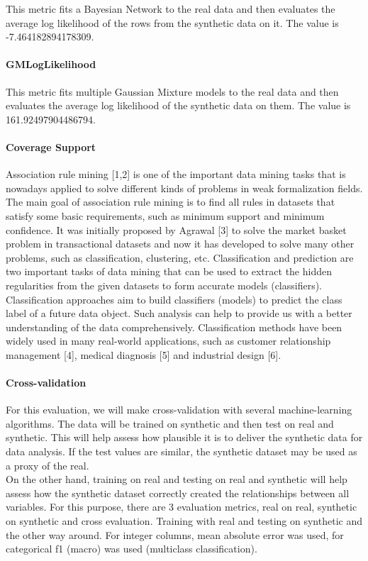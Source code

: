 \documentclass{article}
\begin{document}
This metric fits a Bayesian Network to the real data and then evaluates the average log likelihood of the rows from the synthetic data on it.
The value is -7.464182894178309.\\


\paragraph{GMLogLikelihood}

This metric fits multiple Gaussian Mixture models to the real data and then evaluates the average log likelihood of the synthetic data on them.
The value is 161.92497904486794.\\

\paragraph{Coverage Support}
Association rule mining [1,2] is one of the important data mining tasks that is nowadays applied to solve different kinds of problems in weak formalization fields. The main goal of association rule mining is to find all rules in datasets that satisfy some basic requirements, such as minimum support and minimum confidence. It was initially proposed by Agrawal [3] to solve the market basket problem in transactional datasets and now it has developed to solve many other problems, such as classification, clustering, etc. Classification and prediction are two important tasks of data mining that can be used to extract the hidden regularities from the given datasets to form accurate models (classifiers). Classification approaches aim to build classifiers (models) to predict the class label of a future data object. Such analysis can help to provide us with a better understanding of the data comprehensively. Classification methods have been widely used in many real-world applications, such as customer relationship management [4], medical diagnosis [5] and industrial design [6].

\paragraph{Cross-validation}
For this evaluation, we will make cross-validation with several machine-learning algorithms.
The data will be trained on synthetic and then test on real and synthetic. This will help assess how plausible it is to deliver the synthetic data for data analysis. If the test values are similar, the synthetic dataset may be used as a proxy of the real.\\
On the other hand, training on real and testing on real and synthetic will help assess how the synthetic dataset correctly created the relationships between all variables.
For this purpose, there are 3 evaluation metrics, real on real, synthetic on synthetic and cross evaluation. Training with real and testing on synthetic and the other way around. For integer columns, mean absolute error was used, for categorical f1 (macro) was used (multiclass classification).\\
\end{document}
